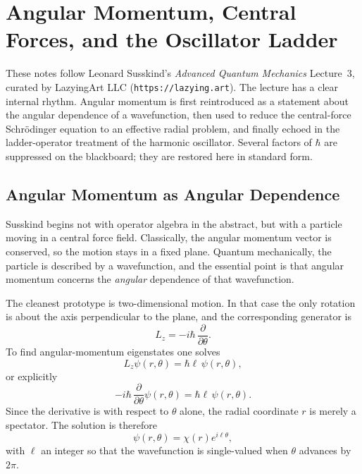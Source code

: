 \chapter{Angular Momentum, Central Forces, and the Oscillator Ladder}

These notes follow Leonard Susskind's \emph{Advanced Quantum Mechanics} Lecture~3, curated by LazyingArt LLC (\texttt{https://lazying.art}). The lecture has a clear internal rhythm. Angular momentum is first reintroduced as a statement about the angular dependence of a wavefunction, then used to reduce the central-force Schr\"odinger equation to an effective radial problem, and finally echoed in the ladder-operator treatment of the harmonic oscillator. Several factors of \(\hbar\) are suppressed on the blackboard; they are restored here in standard form.

\section{Angular Momentum as Angular Dependence}

Susskind begins not with operator algebra in the abstract, but with a particle moving in a central force field. Classically, the angular momentum vector is conserved, so the motion stays in a fixed plane. Quantum mechanically, the particle is described by a wavefunction, and the essential point is that angular momentum concerns the \emph{angular} dependence of that wavefunction.

The cleanest prototype is two-dimensional motion. In that case the only rotation is about the axis perpendicular to the plane, and the corresponding generator is
\begin{equation}
L_z=-i\hbar\,\frac{\partial}{\partial \theta}.
\end{equation}
To find angular-momentum eigenstates one solves
\begin{equation}
L_z\psi(r,\theta)=\hbar \ell\,\psi(r,\theta),
\end{equation}
or explicitly
\begin{equation}
-i\hbar\,\frac{\partial}{\partial \theta}\psi(r,\theta)=\hbar \ell\,\psi(r,\theta).
\end{equation}
Since the derivative is with respect to \(\theta\) alone, the radial coordinate \(r\) is merely a spectator. The solution is therefore
\begin{equation}
\psi(r,\theta)=\chi(r)e^{i\ell\theta},
\end{equation}
with \(\ell\) an integer so that the wavefunction is single-valued when \(\theta\) advances by \(2\pi\).

